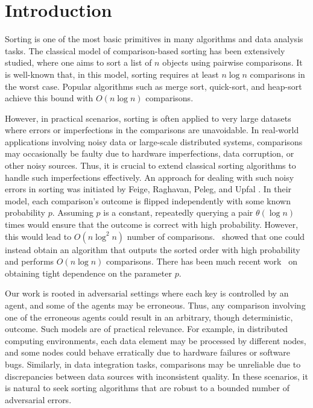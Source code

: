 \documentclass[11pt]{llncs}
\begin{document}
\section{Introduction}
Sorting is one of the most basic primitives in many algorithms and data analysis tasks. The classical model 
of comparison-based sorting has been extensively studied, where one aims to sort 
a list of $n$ objects using pairwise comparisons. It is well-known that, in 
this model, sorting requires at least $ n \log n $ comparisons in the worst case. 
Popular algorithms such as merge sort, quick-sort, and heap-sort achieve 
this bound with $ O(n \log n) $ comparisons.


However, in practical scenarios, sorting is often applied to very large datasets 
where errors or imperfections in the comparisons are unavoidable. In real-world 
applications involving noisy data or large-scale distributed systems, comparisons 
may occasionally be faulty due to hardware imperfections, data corruption, or other 
noisy sources. Thus, it is crucial to extend classical sorting algorithms to handle 
such imperfections effectively.
An approach for dealing with such noisy errors in sorting was initiated by Feige, Raghavan, Peleg, and Upfal \cite{FRPU94}. In their model, 
each comparison's outcome is flipped independently with some known probability $p$. Assuming $p$ is a constant, repeatedly querying a pair $\theta(\log n)$ times would ensure that the outcome is correct with high probability. However, this would lead to $O(n \log^2 n)$ number of comparisons.~\cite{FRPU94} showed that one could instead obtain an algorithm that outputs the sorted order with high probability and performs $O(n \log n)$ comparisons. There has been much recent work~\cite{wgw22,gx23} on obtaining tight dependence on the parameter $p$. 


Our work is rooted in adversarial settings where each key is controlled by an agent, and some of the agents may be erroneous. Thus, any comparison involving one of the erroneous agents could result in an arbitrary, though deterministic, outcome. Such models are of practical relevance. For example, in distributed computing environments, 
each data element may be processed by different nodes, and some nodes could behave 
erratically due to hardware failures or software bugs. Similarly, in data integration 
tasks, comparisons may be unreliable due to discrepancies between data sources with 
inconsistent quality. In these scenarios, it is natural to seek sorting algorithms 
that are robust to a bounded number of adversarial errors.
\end{document}
